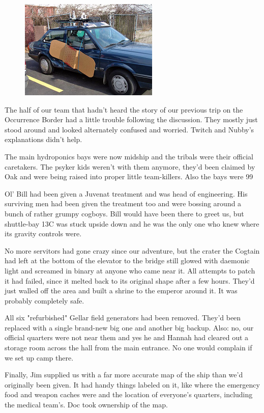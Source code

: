 \begin{figure}
	\begin{center}
		\includegraphics[width=\figwidth]{pics/10/7.png}
	\end{center}
\end{figure}
The half of our team that hadn't heard the story of our previous trip on the Occurrence Border had a little trouble following the discussion. 
They mostly just stood around and looked alternately confused and worried. 
Twitch and Nubby's explanations didn't help.

The main hydroponics bays were now midship and the tribals were their official caretakers. 
The psyker kids weren't with them anymore, they'd been claimed by Oak and were being raised into proper little team-killers. 
Also the bays were 99%

Ol' Bill had been given a Juvenat treatment and was head of engineering. 
His surviving men had been given the treatment too and were bossing around a bunch of rather grumpy cogboys. 
Bill would have been there to greet us, but shuttle-bay 13C was stuck upside down and he was the only one who knew where its gravity controls were.

No more servitors had gone crazy since our adventure, but the crater the Cogtain had left at the bottom of the elevator to the bridge still glowed with daemonic light and screamed in binary at anyone who came near it. 
All attempts to patch it had failed, since it melted back to its original shape after a few hours. 
They'd just walled off the area and built a shrine to the emperor around it. 
It was probably completely safe.

All six "refurbished" Gellar field generators had been removed. 
They'd been replaced with a single brand-new big one and another big backup. 
Also: 
no, our official quarters were not near them and yes he and Hannah had cleared out a storage room across the hall from the main entrance. 
No one would complain if we set up camp there.

Finally, Jim supplied us with a far more accurate map of the ship than we'd originally been given. 
It had handy things labeled on it, like where the emergency food and weapon caches were and the location of everyone's quarters, including the medical team's. 
Doc took ownership of the map.


